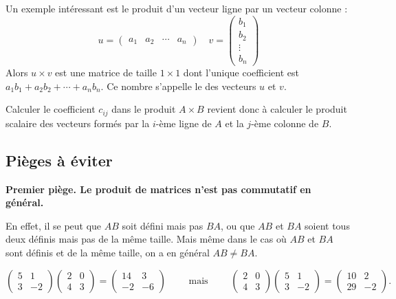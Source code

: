 \documentclass[class=report,crop=false]{standalone}
\begin{document}
\bigskip

Un exemple intéressant est le produit d'un vecteur ligne par un vecteur colonne :
$$u = \begin{pmatrix} a_1 & a_2 & \cdots & a_n \end{pmatrix} \quad
v = \begin{pmatrix} b_1 \\ b_2 \\ \vdots \\ b_n \end{pmatrix}$$
Alors $u \times v$ est une matrice de taille $1\times 1$ dont l'unique coefficient est
$a_1 b_1 + a_2 b_2 + \cdots + a_n b_n$.
Ce nombre s'appelle le  des vecteurs $u$ et $v$.

\medskip

Calculer le coefficient $c_{ij}$ dans le produit $A\times B$
revient donc à calculer le produit scalaire des vecteurs formés
par la $i$-ème ligne de $A$ et la $j$-ème colonne de $B$.


\subsection{Pièges à éviter}

\textbf{Premier piège. Le produit de matrices n'est pas commutatif en général.}

En effet, il se peut que $AB$ soit défini mais pas $BA$, ou que $AB$ et $BA$
soient tous deux définis mais pas de la même taille.
Mais même dans le cas où $AB$ et $BA$ sont définis et de la même taille, on a en général $AB\neq BA$.

\begin{exemple}
$$\begin{pmatrix}
5&1\\3&-2
\end{pmatrix}
\begin{pmatrix}
2&0\\4&3
\end{pmatrix}=
\begin{pmatrix}
14&3\\-2&-6
\end{pmatrix}
\qquad \text{ mais } \qquad
\begin{pmatrix}
2&0\\4&3
\end{pmatrix}
\begin{pmatrix}
5&1\\3&-2
\end{pmatrix}=
\begin{pmatrix}
10&2\\29&-2
\end{pmatrix}.
$$
\end{exemple}
\end{document}
